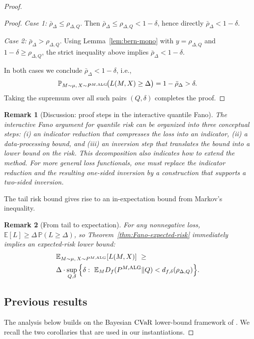 \documentclass[conference]{IEEEtran}
\newtheorem{remark}{Remark}
\begin{document}
\begin{proof}[Proof]
\begin{proof}[Proof]
\emph{Case 1:} \(\bar\rho_\Delta \le \rho_{\Delta,Q}\).
Then \(\bar\rho_\Delta \le \rho_{\Delta,Q} < 1-\delta\), hence directly \(\bar\rho_\Delta<1-\delta\).

\emph{Case 2:} \(\bar\rho_\Delta > \rho_{\Delta,Q}\).
Using Lemma~\ref{lem:bern-mono} with \(y=\rho_{\Delta,Q}\) and \(1-\delta\ge \rho_{\Delta,Q}\), the strict inequality above implies
\(\bar\rho_\Delta < 1-\delta\).

In both cases we conclude \(\bar\rho_\Delta<1-\delta\), i.e.,
\[
\mathbb P_{M\sim\mu,\,X\sim P^{M,\textup{ALG}}}\!\big(L(M,X)\ge \Delta\big)
= 1-\bar\rho_\Delta > \delta.
\]
Taking the supremum over all such pairs \((Q,\delta)\) completes the proof.
\end{proof}
\begin{remark}[Discussion: proof steps in the interactive quantile Fano]
The interactive Fano argument for quantile risk can be organized into three conceptual steps:
(i) an \emph{indicator reduction} that compresses the loss into an indicator,
(ii) a \emph{data-processing} bound,
and (iii) an \emph{inversion} step that translates the bound into a lower bound on the risk.
This decomposition also indicates how to extend the method. For more general loss functionals, one must replace the indicator reduction and the resulting \emph{one-sided} inversion by a construction that supports a \emph{two-sided} inversion.
\end{remark}


The tail risk bound gives rise to an in-expectation bound from Markov's inequality.
\begin{remark}[From tail to expectation]
For any nonnegative loss, \(\mathbb{E}[L]\ge \Delta\,\mathbb P(L\ge \Delta)\), so Theorem~\ref{thm:Fano-expected-risk}
immediately implies an \emph{expected-risk} lower bound:
\[
\begin{aligned}
&\mathbb{E}_{M\sim\mu,\,X\sim P^{M,\textup{ALG}}}[L(M,X)]
\ \ge\
\\
&\Delta\cdot
\sup_{Q,\delta}\Big\{\delta:\ \mathbb{E}_M D_f(P^{M,\textup{ALG}}\|Q)< d_{f,\delta}(\rho_{\Delta,Q})\Big\}.
\end{aligned}
\]
\end{remark}
\fi

\subsection{Previous results}
\label{sec:previous-results}

The analysis below builds on the Bayesian \(\textup{CVaR}\) lower-bound framework of \cite{bongole2026generalizing}. We recall the two corollaries that are used in our instantiations.


\end{proof}
\end{document}
